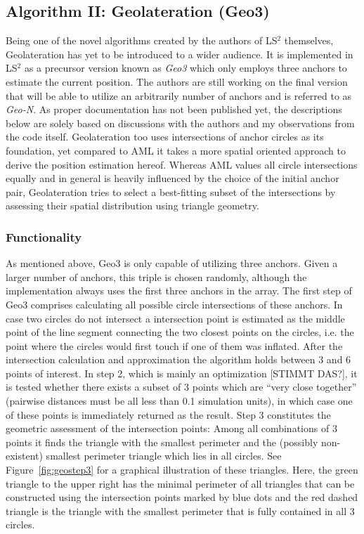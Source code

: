 \subsection{Algorithm II: Geolateration (Geo3)}
Being one of the novel algorithms created by the authors of LS$^{2}$ themselves, Geolateration has yet to be introduced to a wider audience. It is implemented in LS$^{2}$ as a precursor version known as \emph{Geo3} which only employs three anchors to estimate the current position. The authors are still working on the final version that will be able to utilize an arbitrarily number of anchors and is referred to as \emph{Geo-N}. As proper documentation has not been published yet, the descriptions below are solely based on discussions with the authors and my observations from the code itself. Geolateration too uses intersections of anchor circles as its foundation, yet compared to AML it takes a more spatial oriented approach to derive the position estimation hereof. Whereas AML values all circle intersections equally and in general is heavily influenced by the choice of the initial anchor pair, Geolateration tries to select a best-fitting subset of the intersections by assessing their spatial distribution using triangle geometry.

\subsubsection{Functionality}
\label{geo3_functionality}
As mentioned above, Geo3 is only capable of utilizing three anchors. Given a larger number of anchors, this triple is chosen randomly, although the implementation always uses the first three anchors in the array. The first step of Geo3 comprises calculating all possible circle intersections of these anchors. In case two circles do not intersect a intersection point is estimated as the middle point of the line segment connecting the two closest points on the circles, i.e. the point where the circles would first touch if one of them was inflated. After the intersection calculation and approximation the algorithm holds between 3 and 6 points of interest. In step 2, which is mainly an optimization [STIMMT DAS?], it is tested whether there exists a subset of 3 points which are ``very close together'' (pairwise distances must be all less than 0.1 simulation units), in which case one of these points is immediately returned as the result. Step 3 constitutes the geometric assessment of the intersection points: Among all combinations of 3 points it finds the triangle with the smallest perimeter and the (possibly non-existent) smallest perimeter triangle which lies in all circles. See Figure~\ref{fig:geostep3} for a graphical illustration of these triangles. Here, the green triangle to the upper right has the minimal perimeter of all triangles that can be constructed using the intersection points marked by blue dots and the red dashed triangle is the triangle with the smallest perimeter that is fully contained in all 3 circles.

